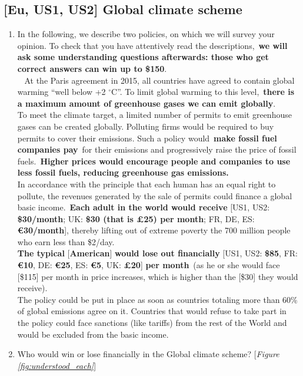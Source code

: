 \subsection*{[Eu, US1, US2] Global climate scheme}\label{subsec:questionnaire_GCS}
\begin{enumerate}[resume] \item[] In the following, we describe two policies, on which we will survey your opinion. To check that you have attentively read the descriptions,~\textbf{we will ask some understanding questions afterwards: those who get correct answers can win up to \$150}. \\
\textbf{}~ At the Paris agreement in 2015, all countries have agreed to contain global warming ``well below +2 $\mathrm{{}^\circ}$C''. To limit global warming to this level,~\textbf{there is a maximum amount of greenhouse gases we can emit globally}.\\
To meet the climate target, a limited number of permits to emit greenhouse gases can be created globally. Polluting firms would be required to buy permits to cover their emissions. Such a policy would~\textbf{make fossil fuel companies pay}~for their emissions and progressively raise the price of fossil fuels.~\textbf{Higher prices would encourage people and companies to use less fossil fuels, reducing greenhouse gas emissions.}\\
In accordance with the principle that each human has an equal right to pollute, the revenues generated by the sale of permits could finance a global basic income.~\textbf{Each adult in the world would receive } [US1, US2: \textbf{\$30/month}; UK: \textbf{\$30 (that is £25) per month}; FR, DE, ES:  \textbf{\euro{}30/month}], thereby lifting out of extreme poverty the 700 million people who earn less than \$2/day.\\
\textbf{The typical }[\textbf{American}]\textbf{ would lose out financially }[US1, US2: \textbf{\$85}, FR: \textbf{\euro{}10}, DE: \textbf{\euro{}25}, ES: \textbf{\euro{}5}, UK: \textbf{£20}]\textbf{ per month}~(as he or she would face [\$115] per month in price increases, which is higher than the [\$30] they would receive). 
\\The policy could be put in place as soon as countries totaling more than 60\% of global emissions agree on it. Countries that would refuse to take part in the policy could face sanctions (like tariffs) from the rest of the World and would be excluded from the basic income.
\item \label{q:understood_gcs} Who would win or lose financially in the Global climate scheme? [\textit{Figure \ref{fig:understood_each}}] \\

\end{enumerate}
